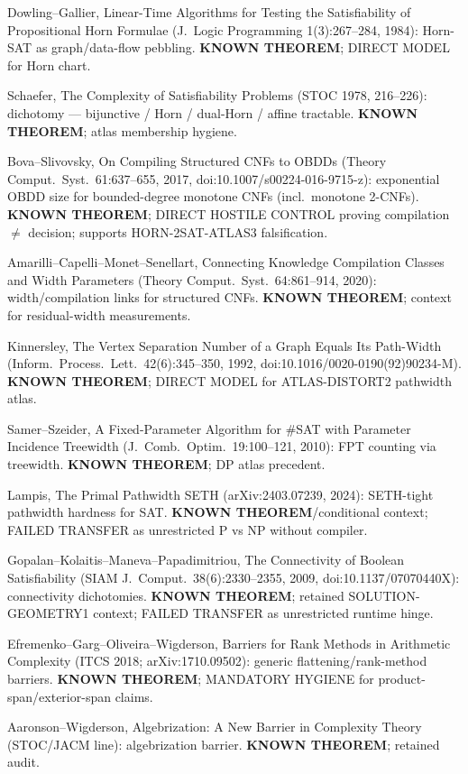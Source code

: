 \documentclass[11pt]{article}
\begin{document}
Dowling--Gallier, Linear-Time Algorithms for Testing the Satisfiability of
Propositional Horn Formulae (J.\ Logic Programming 1(3):267--284, 1984):
Horn-SAT as graph/data-flow pebbling. \textbf{KNOWN THEOREM}; DIRECT MODEL for
Horn chart.

Schaefer, The Complexity of Satisfiability Problems (STOC 1978, 216--226):
dichotomy --- bijunctive / Horn / dual-Horn / affine tractable.
\textbf{KNOWN THEOREM}; atlas membership hygiene.

Bova--Slivovsky, On Compiling Structured CNFs to OBDDs
(Theory Comput.\ Syst.\ 61:637--655, 2017, doi:10.1007/s00224-016-9715-z):
exponential OBDD size for bounded-degree monotone CNFs (incl.\ monotone 2-CNFs).
\textbf{KNOWN THEOREM}; DIRECT HOSTILE CONTROL proving compilation $\neq$ decision;
supports HORN-2SAT-ATLAS3 falsification.

Amarilli--Capelli--Monet--Senellart, Connecting Knowledge Compilation Classes and
Width Parameters (Theory Comput.\ Syst.\ 64:861--914, 2020): width/compilation
links for structured CNFs. \textbf{KNOWN THEOREM}; context for residual-width
measurements.

Kinnersley, The Vertex Separation Number of a Graph Equals Its Path-Width
(Inform.\ Process.\ Lett.\ 42(6):345--350, 1992, doi:10.1016/0020-0190(92)90234-M).
\textbf{KNOWN THEOREM}; DIRECT MODEL for ATLAS-DISTORT2 pathwidth atlas.

Samer--Szeider, A Fixed-Parameter Algorithm for \#SAT with Parameter Incidence
Treewidth (J.\ Comb.\ Optim.\ 19:100--121, 2010): FPT counting via treewidth.
\textbf{KNOWN THEOREM}; DP atlas precedent.

Lampis, The Primal Pathwidth SETH (arXiv:2403.07239, 2024): SETH-tight pathwidth
hardness for SAT. \textbf{KNOWN THEOREM}/conditional context; FAILED TRANSFER as
unrestricted P vs NP without compiler.

Gopalan--Kolaitis--Maneva--Papadimitriou, The Connectivity of Boolean Satisfiability
(SIAM J.\ Comput.\ 38(6):2330--2355, 2009, doi:10.1137/07070440X):
connectivity dichotomies. \textbf{KNOWN THEOREM}; retained SOLUTION-GEOMETRY1 context;
FAILED TRANSFER as unrestricted runtime hinge.

Efremenko--Garg--Oliveira--Wigderson, Barriers for Rank Methods in Arithmetic Complexity
(ITCS 2018; arXiv:1710.09502): generic flattening/rank-method barriers.
\textbf{KNOWN THEOREM}; MANDATORY HYGIENE for product-span/exterior-span claims.

Aaronson--Wigderson, Algebrization: A New Barrier in Complexity Theory
(STOC/JACM line): algebrization barrier. \textbf{KNOWN THEOREM}; retained audit.
\end{document}
